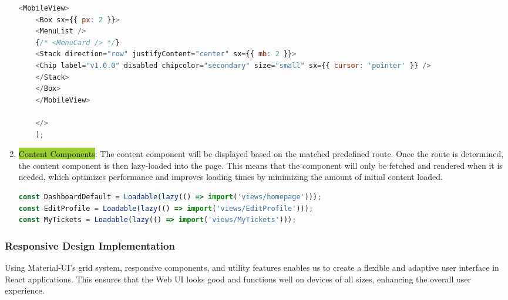 \begin{enumerate}
\begin{lstlisting}[language=Javascript, breaklines=true, caption=Frontend Sidebar Component]
	<MobileView>
	<Box sx={{ px: 2 }}>
	<MenuList />
	{/* <MenuCard /> */}
	<Stack direction="row" justifyContent="center" sx={{ mb: 2 }}>
	<Chip label="v1.0.0" disabled chipcolor="secondary" size="small" sx={{ cursor: 'pointer' }} />
	</Stack>
	</Box>
	</MobileView>
	
	</>
	);
\end{lstlisting}		
		
		
		
		
		
		\item  \colorbox{YellowGreen}{Content Components}: The content component will be displayed based on the matched predefined route. Once the route is determined, the content component is then lazy-loaded into the page. This means that the component will only be fetched and rendered when it is needed, which optimizes performance and improves loading times by minimizing the amount of initial content loaded.
		
		
\begin{lstlisting}[language=Javascript, breaklines=true, caption=Example of Lazy Load Frontend Components]
const DashboardDefault = Loadable(lazy(() => import('views/homepage')));
const EditProfile = Loadable(lazy(() => import('views/EditProfile')));
const MyTickets = Loadable(lazy(() => import('views/MyTickets')));
\end{lstlisting}	
		
	\end{enumerate}
	
	
	\subsubsection{Responsive Design Implementation}
	Using Material-UI's grid system, responsive components, and utility features enables us to create a flexible and adaptive user interface in React applications. This ensures that the Web UI looks good and functions well on devices of all sizes, enhancing the overall user experience.
	
